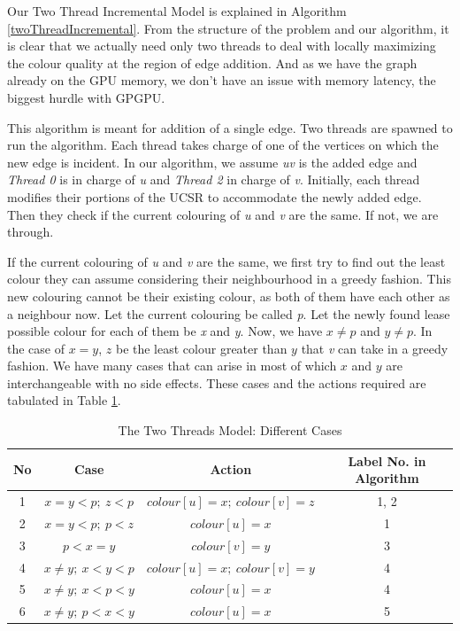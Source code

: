 \documentclass[MTech]{iitmdiss}
\begin{document}
Our Two Thread Incremental Model is explained in Algorithm \ref{twoThreadIncremental}. From the structure of the problem and our algorithm, it is clear that we actually need only two threads to deal with locally maximizing the colour quality at the region of edge addition. And as we have the graph already on the GPU memory, we don't have an issue with memory latency, the biggest hurdle with GPGPU.

This algorithm is meant for addition of a single edge. Two threads are spawned to run the algorithm. Each thread takes charge of one of the vertices on which the new edge is incident. In our algorithm, we assume \textit{uv} is the added edge and \textit{Thread 0} is in charge of \textit{u} and \textit{Thread 2} in charge of \textit{v}. Initially, each thread modifies their portions of the UCSR to accommodate the newly added edge. Then they check if the current colouring of \textit{u} and \textit{v} are the same. If not, we are through.

If the current colouring of \textit{u} and \textit{v} are the same, we first try to find out the least colour they can assume considering their neighbourhood in a greedy fashion. This new colouring cannot be their existing colour, as both of them have each other as a neighbour now. Let the current colouring be called \textit{p}. Let the newly found lease possible colour for each of them be \textit{x} and \textit{y}. Now, we have $x \neq p$ and $y \neq p$. In the case of $x=y$, $z$ be the least colour greater than $y$ that \textit{v} can take in a greedy fashion. We have many cases that can arise in most of which $x$ and $y$ are interchangeable with no side effects. These cases and the actions required are tabulated in Table \ref{table:3}. 

\begin{table}[h]
\centering
\begin{tabular}{||c|c|c|c||} 
 \hline
 No & Case & Action & Label No. in Algorithm \\ [0.5ex] 
 \hline\hline
1 & $x=y < p; \: z<p$ & $colour[u]=x; \: colour[v]=z$ & 1, 2 \\
\hline
2 & $x=y < p; \: p<z$ & $colour[u]=x$ & 1\\
\hline
3 & $p < x=y$ & $colour[v]=y$ & 3\\
\hline
4 & $x \neq y; \: x < y < p$ & $colour[u]=x; \: colour[v]=y$ & 4\\
\hline
5 & $x \neq y; \: x < p < y$ & $colour[u]=x$ & 4\\
\hline
6 & $x \neq y; \: p < x < y$ & $colour[u]=x$& 5\\
\hline
\end{tabular}
\caption{The Two Threads Model: Different Cases}
\label{table:3}
\end{table}
\end{document}

